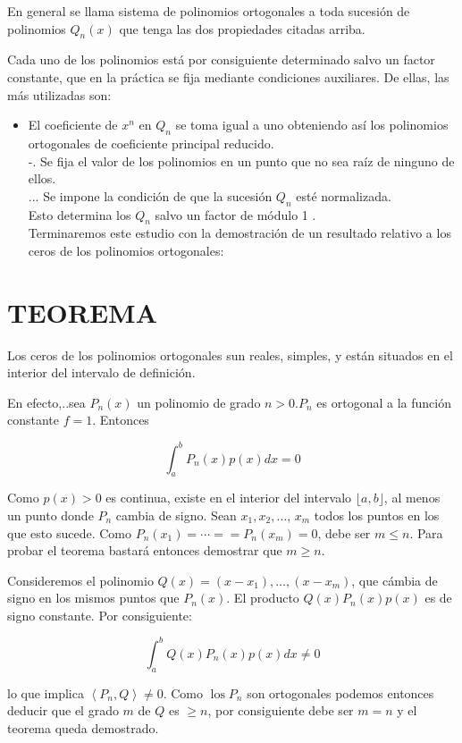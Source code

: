 \documentclass[10pt]{article}
\theoremstyle{plain}
\theoremstyle{definition}
\theoremstyle{remark}
\begin{document}
En general se llama sistema de polinomios ortogonales a toda sucesión de polinomios $Q_{n}(x)$ que tenga las dos propiedades citadas arriba.

Cada uno de los polinomios está por consiguiente determinado salvo un factor constante, que en la práctica se fija mediante condiciones auxiliares. De ellas, las más utilizadas son:

\begin{itemize}
  \item El coeficiente de $x^{n}$ en $Q_{n}$ se toma igual a uno obteniendo así los polinomios ortogonales de coeficiente principal reducido.\\
-. Se fija el valor de los polinomios en un punto que no sea raíz de ninguno de ellos.\\
... Se impone la condición de que la sucesión $Q_{n}$ esté normalizada.\\
Esto determina los $Q_{n}$ salvo un factor de módulo 1 .\\
Terminaremos este estudio con la demostración de un resultado relativo a los ceros de los polinomios ortogonales:
\end{itemize}

\section*{TEOREMA}
Los ceros de los polinomios ortogonales sun reales, simples, y están situados en el interior del intervalo de definición.

En efecto,..sea $P_{n}(x)$ un polinomio de grado $n>0 . P_{n}$ es ortogonal a la función constante $f=1$. Entonces

$$
\int_{a}^{b} P_{n}(x) p(x) d x=0
$$

Como $p(x)>0$ es continua, existe en el interior del intervalo $\lfloor a, b\rfloor$, al menos un punto donde $P_{n}$ cambia de signo. Sean $x_{1}, x_{2}, \ldots$, $x_{m}$ todos los puntos en los que esto sucede. Como $P_{n}\left(x_{1}\right)=\cdots= =P_{n}\left(x_{m}\right)=0$, debe ser $m \leqslant n$. Para probar el teorema bastará entonces demostrar que $m \geqslant n$.

Consideremos el polinomio $Q(x)=\left(x-x_{1}\right), \ldots,\left(x-x_{m}\right)$, que cámbia de signo en los mismos puntos que $P_{n}(x)$. El producto $Q(x) P_{n}(x) p(x)$ es de signo constante. Por consiguiente:

$$
\int_{a}^{b} Q(x) P_{n}(x) p(x) d x \neq 0
$$

lo que implica $\left\langle P_{n}, Q\right\rangle \neq 0$. Como $\operatorname{los} P_{n}$ son ortogonales podemos entonces deducir que el grado $m$ de $Q$ es $\geqslant n$, por consiguiente debe ser $m=n$ y el teorema queda demostrado.
\end{document}
